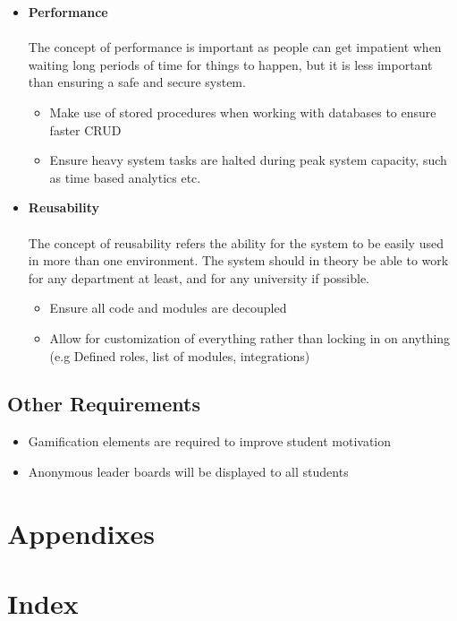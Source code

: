 \documentclass[a4paper,12pt]{article}
\begin{document}
\begin{itemize}
        	\item \textbf{Performance}\\\\
        	The concept of performance is important as people can get impatient when waiting long periods of time for things to happen, but it is less important than ensuring a safe and secure system.
        	\begin{itemize}
        		\item Make use of stored procedures when working with databases to ensure faster CRUD
        		\item Ensure heavy system tasks are halted during peak system capacity, such as time based analytics etc.
        	\end{itemize}
        	
        	\item \textbf{Reusability}\\\\
        	The concept of reusability refers the ability for the system to be easily used in more than one environment. The system should in theory be able to work for any department at least, and for any university if possible.
        	\begin{itemize}
        		\item Ensure all code and modules are decoupled
        		\item Allow for customization of everything rather than locking in on anything (e.g Defined roles, list of modules, integrations)
        	\end{itemize}
        \end{itemize}

        \subsection{Other Requirements}
        \begin{itemize}
        \item Gamification elements are required to improve student motivation
        \item Anonymous leader boards will be displayed to all students
        \end{itemize}
    \section{Appendixes}
    
    \section{Index}
    
    \pagebreak  
\end{document}
